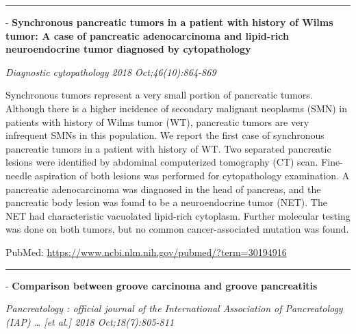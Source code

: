 \documentclass[]{article}
\begin{document}
{}

{}

\begin{center}\rule{0.5\linewidth}{\linethickness}\end{center}

 - \textbf{Synchronous pancreatic tumors in a patient with history of
Wilms tumor: A case of pancreatic adenocarcinoma and lipid-rich
neuroendocrine tumor diagnosed by cytopathology}

\emph{Diagnostic cytopathology 2018 Oct;46(10):864-869}

Synchronous tumors represent a very small portion of pancreatic tumors.
Although there is a higher incidence of secondary malignant neoplasms
(SMN) in patients with history of Wilms tumor (WT), pancreatic tumors
are very infrequent SMNs in this population. We report the first case of
synchronous pancreatic tumors in a patient with history of WT. Two
separated pancreatic lesions were identified by abdominal computerized
tomography (CT) scan. Fine-needle aspiration of both lesions was
performed for cytopathology examination. A pancreatic adenocarcinoma was
diagnosed in the head of pancreas, and the pancreatic body lesion was
found to be a neuroendocrine tumor (NET). The NET had characteristic
vacuolated lipid-rich cytoplasm. Further molecular testing was done on
both tumors, but no common cancer-associated mutation was found.

PubMed: \url{https://www.ncbi.nlm.nih.gov/pubmed/?term=30194916}

{}

{}

\begin{center}\rule{0.5\linewidth}{\linethickness}\end{center}

 - \textbf{Comparison between groove carcinoma and groove pancreatitis}

\emph{Pancreatology : official journal of the International Association
of Pancreatology (IAP) \ldots{} {[}et al.{]} 2018 Oct;18(7):805-811}
\end{document}
